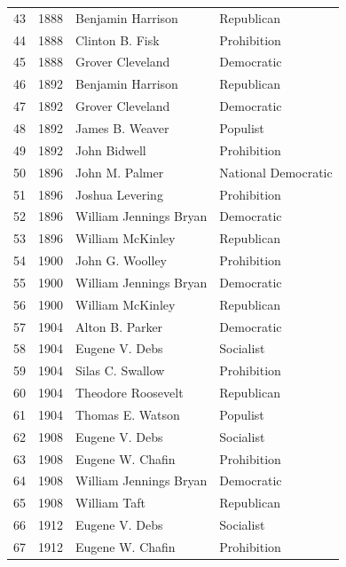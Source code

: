 \documentclass[
  letterpaper,
  DIV=11,
  numbers=noendperiod]{scrreprt}
\begin{document}
\begin{tabular}{lrll}
43  &  1888 &       Benjamin Harrison &             Republican \\
44  &  1888 &         Clinton B. Fisk &            Prohibition \\
45  &  1888 &        Grover Cleveland &             Democratic \\
46  &  1892 &       Benjamin Harrison &             Republican \\
47  &  1892 &        Grover Cleveland &             Democratic \\
48  &  1892 &         James B. Weaver &               Populist \\
49  &  1892 &            John Bidwell &            Prohibition \\
50  &  1896 &          John M. Palmer &    National Democratic \\
51  &  1896 &         Joshua Levering &            Prohibition \\
52  &  1896 &  William Jennings Bryan &             Democratic \\
53  &  1896 &        William McKinley &             Republican \\
54  &  1900 &         John G. Woolley &            Prohibition \\
55  &  1900 &  William Jennings Bryan &             Democratic \\
56  &  1900 &        William McKinley &             Republican \\
57  &  1904 &         Alton B. Parker &             Democratic \\
58  &  1904 &          Eugene V. Debs &              Socialist \\
59  &  1904 &        Silas C. Swallow &            Prohibition \\
60  &  1904 &      Theodore Roosevelt &             Republican \\
61  &  1904 &        Thomas E. Watson &               Populist \\
62  &  1908 &          Eugene V. Debs &              Socialist \\
63  &  1908 &        Eugene W. Chafin &            Prohibition \\
64  &  1908 &  William Jennings Bryan &             Democratic \\
65  &  1908 &            William Taft &             Republican \\
66  &  1912 &          Eugene V. Debs &              Socialist \\
67  &  1912 &        Eugene W. Chafin &            Prohibition \\

\end{tabular}
\end{document}
